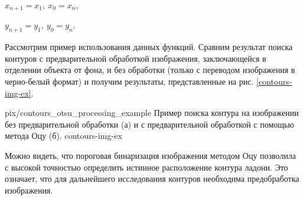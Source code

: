 $x_{n+1}=x_1,~x_0=x_n$,

$y_{n+1}=y_1,~y_0=y_n$.

\bigskip

Рассмотрим пример использования данных функций. Сравним результат
поиска контуров с предварительной обработкой изображения, 
заключающейся в отделении объекта от фона, и без обработки (только с 
переводом изображения в черно-белый формат) и 
получим результаты, представленные на рис. \ref{contours-img-ex}.

{pix/contours_otsu_processing_example}
{Пример поиска контура на изображении без предварительной обработки
(а) и с предварительной обработкой с помощью метода Оцу (б).}
{contours-img-ex}

Можно видеть, что пороговая бинаризация изображения методом Оцу 
позволила с высокой точностью определить истинное расположение контура
ладони. Это означает, что для дальнейшего исследования контуров
необходима предобработка изображения.


